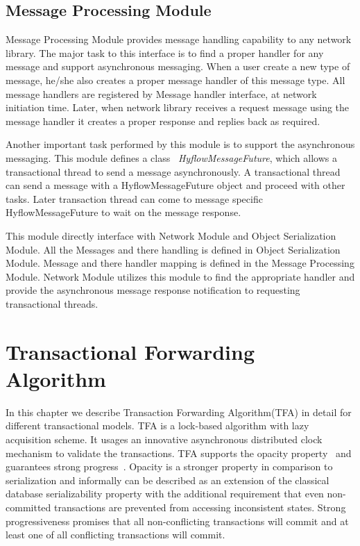 \documentclass[12pt,english]{report}
\begin{document}
\section{Message Processing Module}

Message Processing Module provides message handling capability to any network library. The major task to this interface is to find a proper handler for any message and support asynchronous messaging. When a user create a new type of message, he/she also creates a proper message handler of this message type. All message handlers are registered by Message handler interface, at network initiation time. Later, when network library receives a request message using the message handler it creates a proper response and replies back as required.

Another important task performed by this module is to support the asynchronous messaging. This module defines a class ~\emph{HyflowMessageFuture}, which allows a transactional thread to send a message asynchronously. A transactional thread can send a message with a HyflowMessageFuture object and proceed with other tasks. Later transaction thread can come to message specific HyflowMessageFuture to wait on the message response. 

This module directly interface with Network Module and Object Serialization Module. All the Messages and there handling is defined in Object Serialization Module. Message and there handler mapping is defined in the Message Processing Module. Network Module utilizes this module to find the appropriate handler and provide the asynchronous message response notification to requesting transactional threads.

\chapter{Transactional Forwarding Algorithm}\label{chap:algorithm}

In this chapter we describe Transaction Forwarding Algorithm(TFA) in detail for different transactional models. TFA is a lock-based algorithm with lazy acquisition scheme. It usages an innovative asynchronous distributed clock mechanism to validate the transactions. TFA supports the opacity property~\cite{guerraoui2009semantics} and guarantees  strong progress~\cite{guerraoui2009semantics}. Opacity is a stronger property in comparison to serialization and informally can be described as an extension of the classical database serializability property with the additional requirement that even non-committed transactions are prevented from accessing inconsistent states. Strong progressiveness promises that all non-conflicting transactions will commit and at least one of all conflicting transactions will commit.  
 
\end{document}
